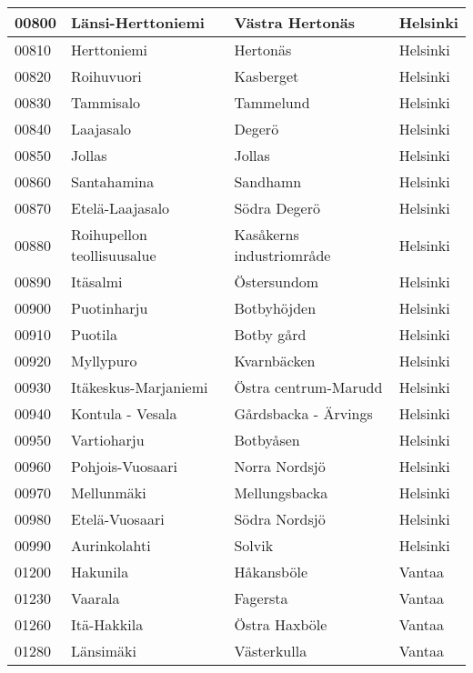 \begin{longtable}{llll}
    00800 & Länsi-Herttoniemi & Västra Hertonäs & Helsinki \\ [0.25ex] \hline
    00810 & Herttoniemi & Hertonäs & Helsinki \\ [0.25ex] \hline
    00820 & Roihuvuori & Kasberget & Helsinki \\ [0.25ex] \hline
    00830 & Tammisalo & Tammelund & Helsinki \\ [0.25ex] \hline
    00840 & Laajasalo & Degerö & Helsinki \\ [0.25ex] \hline
    00850 & Jollas & Jollas & Helsinki \\ [0.25ex] \hline
    00860 & Santahamina & Sandhamn & Helsinki \\ [0.25ex] \hline
    00870 & Etelä-Laajasalo & Södra Degerö & Helsinki \\ [0.25ex] \hline
    00880 & Roihupellon teollisuusalue & Kasåkerns industriområde & Helsinki \\ [0.25ex] \hline
    00890 & Itäsalmi & Östersundom & Helsinki \\ [0.25ex] \hline
    00900 & Puotinharju & Botbyhöjden & Helsinki \\ [0.25ex] \hline
    00910 & Puotila & Botby gård & Helsinki \\ [0.25ex] \hline
    00920 & Myllypuro & Kvarnbäcken & Helsinki \\ [0.25ex] \hline
    00930 & Itäkeskus-Marjaniemi & Östra centrum-Marudd & Helsinki \\ [0.25ex] \hline
    00940 & Kontula - Vesala & Gårdsbacka - Ärvings & Helsinki \\ [0.25ex] \hline
    00950 & Vartioharju & Botbyåsen & Helsinki \\ [0.25ex] \hline
    00960 & Pohjois-Vuosaari & Norra  Nordsjö & Helsinki \\ [0.25ex] \hline
    00970 & Mellunmäki & Mellungsbacka & Helsinki \\ [0.25ex] \hline
    00980 & Etelä-Vuosaari & Södra Nordsjö & Helsinki \\ [0.25ex] \hline
    00990 & Aurinkolahti & Solvik & Helsinki \\ [0.25ex] \hline
    01200 & Hakunila & Håkansböle & Vantaa \\ [0.25ex] \hline
    01230 & Vaarala & Fagersta & Vantaa \\ [0.25ex] \hline
    01260 & Itä-Hakkila & Östra Haxböle & Vantaa \\ [0.25ex] \hline
    01280 & Länsimäki & Västerkulla & Vantaa \\ [0.25ex] \hline

\end{longtable}
